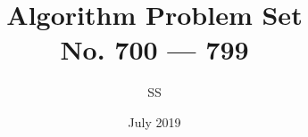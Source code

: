 \documentclass[a4paper,12pt]{article}
\title{Algorithm Problem Set \\ \large No. 700 --- 799}
\author{SS}
\date{July 2019}
\begin{document}
\renewcommand{\thelstlisting}{\thesection.\arabic{lstlisting}}
\newcommand{\fcc}[1]{\lstinline[language=C++, basicstyle=\small\ttfamily, keywordstyle=\bfseries\color{green!40!black}]|#1|}
\newcommand{\fcj}[1]{\lstinline[language=Java, basicstyle=\small\ttfamily, keywordstyle=\bfseries\color{green!40!black}]|#1|}
\maketitle




% 
% 
% 
% 
% 
% 
% 
% 
% 
% 












































\end{document}
